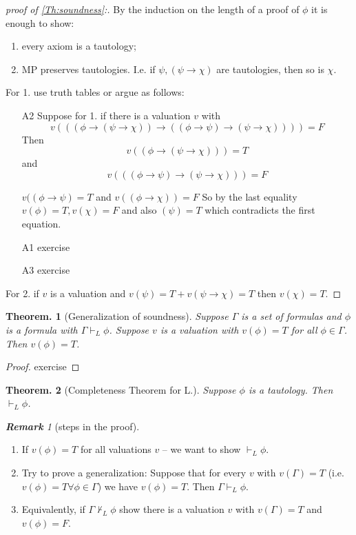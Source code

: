 \documentclass[a4paper,oneside,11pt,DIV=12,parskip=half]{scrartcl}
\theoremstyle{plain}
\newtheorem{theorem}{Theorem.}[section]
\theoremstyle{definition}
\newtheorem{remark, definition}[theorem]{Remark and Definition.}
\newtheorem{lemma, definition}[theorem]{Lemma and Definition.}
\newtheorem{theorem, definition}[theorem]{Theorem and Definition.}
\theoremstyle{remark}
\newtheorem*{remark}{\textbf{Remark}}
\newtheorem*{remark, example}{\textbf{Remark and Exercise}}
\begin{document}
\begin{proof}[proof of \ref{Th:soundness}:] By the induction on the length of a proof of $\phi$ it is enough to show:
\begin{enumerate}
    \item every axiom is a tautology;
    \item MP preserves tautologies. I.e. if $\psi,(\psi \rightarrow \chi)$ are tautologies, then so is $\chi$.
\end{enumerate}
For 1. use truth tables or argue as follows:
\begin{itemize}
    \item [A2] Suppose for 1. if there is a valuation $v$ with \[ v(((\phi \rightarrow (\psi \rightarrow \chi)) \rightarrow ((\phi \rightarrow \psi) \rightarrow (\psi \rightarrow \chi)))) = F \]
    Then \[ v((\phi \rightarrow (\psi \rightarrow \chi))) = T \] and 
        \[ v(((\phi \rightarrow \psi) \rightarrow (\psi \rightarrow \chi))) = F \]
    
    $v((\phi \rightarrow \psi) = T$ and $v((\phi \rightarrow \chi)) = F$
    So by the last equality $v(\phi) = T, v(\chi) = F$ and also $(\psi) = T$ which contradicts the first equation.
    \item[A1] exercise
    \item[A3] exercise
\end{itemize}
For 2. if $v$ is a valuation and $v(\psi) = T + v(\psi \rightarrow \chi) = T$ then $v(\chi) = T$.

\end{proof}

\begin{theorem}[Generalization of soundness]

Suppose $\Gamma$ is a set of formulas and $\phi$ is a formula with $\Gamma \vdash_L \phi$. Suppose $v$ is a valuation with $v(\phi) = T$ for all $\phi \in \Gamma$. Then $v(\phi) = T$.
\end{theorem}
\begin{proof}
exercise
\end{proof}

\begin{theorem}[Completeness Theorem for L.]
Suppose $\phi$ is a tautology. Then $\vdash_L \phi$.

\end{theorem}

\begin{remark}[steps in the proof]
\begin{enumerate}
    \item 
 If $v(\phi) = T$ for all valuations $v$ -- we want to show $\vdash_L \phi$.
    \item Try to prove a generalization: Suppose that for every $v$ with $v(\Gamma) = T$ (i.e. $v(\phi) = T \forall \phi \in \Gamma$) we have $v(\phi) = T$. Then $\Gamma \vdash_L \phi$.
    \item Equivalently, if $\Gamma \not \vdash_L \phi$ show there is a valuation $v$ with $v(\Gamma) = T$ and $v(\phi) = F$.
\end{enumerate}
\end{remark}
\end{document}
